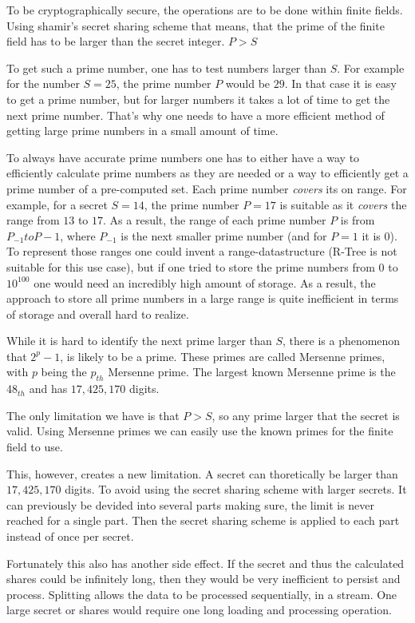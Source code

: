 To be cryptographically secure, the operations are to be done within finite
fields. Using shamir's secret sharing scheme that means, that the prime of the
finite field has to be larger than the secret integer. $P > S$

To get such a prime number, one has to test numbers larger than $S$. For example
for the number $S = 25$, the prime number $P$ would be $29$. In that case it is
easy to get a prime number, but for larger numbers it takes a lot of time to get
the next prime number. That's why one needs to have a more efficient method of
getting large prime numbers in a small amount of time.

To always have accurate prime numbers one has to either have a way to efficiently
calculate prime numbers as they are needed or a way to efficiently get a prime
number of a pre-computed set. Each prime number \textit{covers} its on range. For
example, for a secret $S = 14$, the prime number $P = 17$ is suitable as it
\textit{covers} the range from $13$ to $17$. As a result, the range of each
prime number $P$ is from $P_{-1} to P-1$, where $P_{-1}$ is the next smaller
prime number (and for $P = 1$ it is $0$). To represent those ranges one could
invent a range-datastructure (R-Tree is not suitable for this use case), but
if one tried to store the prime numbers from $0$ to $10^{100}$ one would need
an incredibly high amount of storage. As a result, the approach to store all
prime numbers in a large range is quite inefficient in terms of storage and
overall hard to realize.

While it is hard to identify the next prime larger than $S$, there is
a phenomenon that $2^p-1$, is likely to be a prime. These primes are called
Mersenne primes, with $p$ being the $p_{th}$ Mersenne prime. The largest known
Mersenne prime is the 48$_{th}$ and has $17,425,170$ digits.

The only limitation we have is that $P > S$, so any prime larger that the
secret is valid. Using Mersenne primes we can easily use the known primes for
the finite field to use.

This, however, creates a new limitation. A secret can thoretically be larger
than $17,425,170$ digits. To avoid using the secret sharing scheme with larger
secrets. It can previously be devided into several parts making sure, the limit
is never reached for a single part. Then the secret sharing scheme is applied to
each part instead of once per secret.

Fortunately this also has another side effect. If the secret and thus the
calculated shares could be infinitely long, then they would be very inefficient
to persist and process. Splitting allows the data to be processed sequentially,
in a stream. One large secret or shares would require one long loading and
processing operation.

